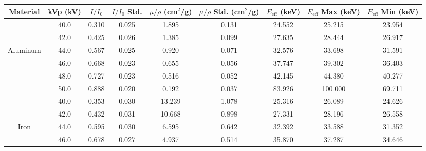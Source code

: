 \begin{tabularx}{1.27\textwidth}{CCCCCCCCC}

    \toprule
    Material & kVp (kV) &  $I/I_0$ &  $I/I_0$ Std. &  $\mu/\rho$ (cm$^2$/g) &  $\mu/\rho$ Std. (cm$^2$/g) &  $E_{\text{eff}}$ (keV) &  $E_{\text{eff}}$ Max (keV) &  $E_{\text{eff}}$ Min (keV) \\
    \midrule
    & 40.0 &    0.310 &         0.025 &                  1.895 &                       0.131 &                  24.552 &                      25.215 &                      23.954 \\
    & 42.0 &    0.425 &         0.026 &                  1.385 &                       0.099 &                  27.635 &                      28.444 &                      26.917 \\
    Aluminum& 44.0 &    0.567 &         0.025 &                  0.920 &                       0.071 &                  32.576 &                      33.698 &                      31.591 \\
    & 46.0 &    0.668 &         0.023 &                  0.655 &                       0.056 &                  37.747 &                      39.302 &                      36.403 \\
    & 48.0 &    0.727 &         0.023 &                  0.516 &                       0.052 &                  42.145 &                      44.380 &                      40.277 \\
    & 50.0 &    0.888 &         0.020 &                  0.192 &                       0.037 &                  83.926 &                     100.000 &                      69.711 \\
    \midrule
    & 40.0 &    0.353 &         0.030 &                 13.239 &                       1.078 &                  25.316 &                      26.089 &                      24.626 \\
    & 42.0 &    0.432 &         0.031 &                 10.668 &                       0.898 &                  27.331 &                      28.196 &                      26.558 \\
    Iron& 44.0 &    0.595 &         0.030 &                  6.595 &                       0.642 &                  32.392 &                      33.588 &                      31.352 \\
    & 46.0 &    0.678 &         0.027 &                  4.937 &                       0.514 &                  35.870 &                      37.287 &                      34.646 \\

\end{tabularx}
